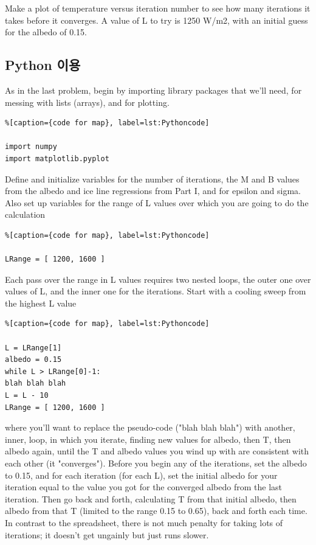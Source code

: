 {Make a plot of temperature versus iteration number to see how many iterations it takes before it converges. A value of L to try is 1250 W/m2, with an initial guess for the albedo of 0.15.

\subsection{Python 이용}\index{}

As in the last problem, begin by importing library packages that we'll need, for messing with lists (arrays), and for plotting.

\begin{lstlisting}%[caption={code for map}, label=lst:Pythoncode]

import numpy
import matplotlib.pyplot
\end{lstlisting}

Define and initialize variables for the number of iterations, the M and B values from the albedo and ice line regressions from Part I, and for epsilon and sigma. Also set up variables for the range of L values over which you are going to do the calculation

\begin{lstlisting}%[caption={code for map}, label=lst:Pythoncode]

LRange = [ 1200, 1600 ]
\end{lstlisting}
Each pass over the range in L values requires two nested loops, the outer one over values of L, and the inner one for the iterations. Start with a cooling sweep from the highest L value

\begin{lstlisting}%[caption={code for map}, label=lst:Pythoncode]

L = LRange[1]
albedo = 0.15
while L > LRange[0]-1:
blah blah blah
L = L - 10
LRange = [ 1200, 1600 ]
\end{lstlisting}

where you'll want to replace the pseudo-code ("blah blah blah") with another, inner, loop, in which you iterate, finding new values for albedo, then T, then albedo again, until the T and albedo values you wind up with are consistent with each other (it "converges"). Before you begin any of the iterations, set the albedo to 0.15, and for each iteration (for each L), set the initial albedo for your iteration equal to the value you got for the converged albedo from the last iteration. Then go back and forth, calculating T from that initial albedo, then albedo from that T (limited to the range 0.15 to 0.65), back and forth each time. In contrast to the spreadsheet, there is not much penalty for taking lots of iterations; it doesn’t get ungainly but just runs slower.

}
